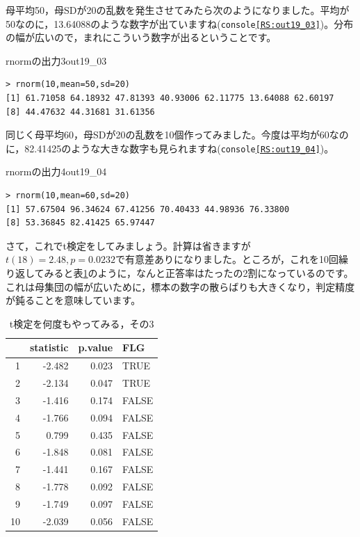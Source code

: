 \documentclass{ltjsarticle}
\begin{document}
母平均50，母SDが20の乱数を発生させてみたら次のようになりました。平均が50なのに，13.64088のような数字が出ていますね(\texttt{console\ref{RS:out19_03}})。分布の幅が広いので，まれにこういう数字が出るということです。
\begin{Rscreen}{rnormの出力3}{out19_03}
    \begin{verbatim}
> rnorm(10,mean=50,sd=20)
[1] 61.71058 64.18932 47.81393 40.93006 62.11775 13.64088 62.60197
[8] 44.47632 44.31681 31.61356
\end{verbatim}
\end{Rscreen}

同じく母平均60，母SDが20の乱数を10個作ってみました。今度は平均が60なのに，82.41425のような大きな数字も見られますね(\texttt{console\ref{RS:out19_04}})。
\begin{Rscreen}{rnormの出力4}{out19_04}
\begin{verbatim}
> rnorm(10,mean=60,sd=20)
[1] 57.67504 96.34624 67.41256 70.40433 44.98936 76.33800
[8] 53.36845 82.41425 65.97447
\end{verbatim}
\end{Rscreen}

さて，これでt検定をしてみましょう。計算は省きますが$t(18)=2.48,p=0.0232$で有意差ありになりました。ところが，これを10回繰り返してみると表\ref{tbl::19_05}のように，なんと正答率はたったの2割になっているのです。これは母集団の幅が広いために，標本の数字の散らばりも大きくなり，判定精度が鈍ることを意味しています。

\begin{table}[ht]
    \centering
    \caption{t検定を何度もやってみる，その3} 
    \begin{tabular}{rrrl}
      \hline
     & statistic & p.value & FLG \\ 
      \hline
    1 & -2.482 & 0.023 & TRUE \\ 
      2 & -2.134 & 0.047 & TRUE \\ 
      3 & -1.416 & 0.174 & FALSE \\ 
      4 & -1.766 & 0.094 & FALSE \\ 
      5 & 0.799 & 0.435 & FALSE \\ 
      6 & -1.848 & 0.081 & FALSE \\ 
      7 & -1.441 & 0.167 & FALSE \\ 
      8 & -1.778 & 0.092 & FALSE \\ 
      9 & -1.749 & 0.097 & FALSE \\ 
      10 & -2.039 & 0.056 & FALSE \\ 
       \hline
    \end{tabular}
    \label{tbl::19_05}
    \end{table}
\end{document}
